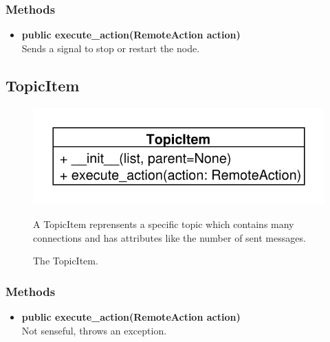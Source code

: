 \subsubsection{Methods}
\begin{itemize}
  \item \textbf{public execute\_action(RemoteAction action)}\\
  Sends a signal to stop or restart the node.
\end{itemize}

\subsection{TopicItem}
\begin{figure}[htbp]
	\begin{minipage}[t]{7cm}
		\vspace{0pt}
		\centering
		\includegraphics[scale=0.6]{./diagram_pictures/TopicItem.pdf}
		\caption{The TopicItem.}
	\end{minipage}
	\hfill
	\begin{minipage}[t]{8cm}
		\vspace{10pt}		
		A TopicItem reprensents a specific topic which contains many connections and has attributes like the number of sent messages.
	\end{minipage}
\end{figure} 
\subsubsection{Methods}
\begin{itemize}
  \item \textbf{public execute\_action(RemoteAction action)}\\ 
  Not senseful, throws an exception.
\end{itemize}

